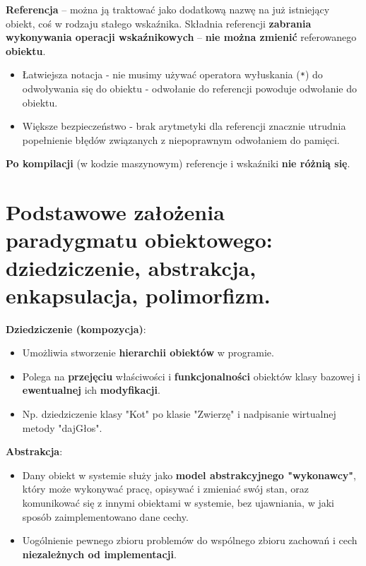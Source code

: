 \documentclass[main.tex]{subfiles}
\begin{document}
    \noindent \textbf{Referencja} -- można ją traktować jako dodatkową nazwę na już istniejący obiekt, coś w rodzaju
    stałego wskaźnika. Składnia referencji \textbf{zabrania wykonywania operacji wskaźnikowych} -- \textbf{nie można
    zmienić} referowanego \textbf{obiektu}.
    \begin{itemize}
        \item Łatwiejsza notacja - nie musimy używać operatora wyłuskania (\texttt{*}) do odwoływania się do obiektu -
        odwołanie do referencji powoduje odwołanie do obiektu.
        \item Większe bezpieczeństwo - brak arytmetyki dla referencji znacznie utrudnia popełnienie błędów związanych
        z niepoprawnym odwołaniem do pamięci.
    \end{itemize}

    \noindent \textbf{Po kompilacji} (w kodzie maszynowym) referencje i wskaźniki \textbf{nie różnią się}.


    \section{Podstawowe założenia paradygmatu obiektowego: dziedziczenie, abstrakcja, enkapsulacja, polimorfizm.}

    \textbf{Dziedziczenie (kompozycja)}:
    \begin{itemize}[noitemsep]
        \item Umożliwia stworzenie \textbf{hierarchii obiektów} w programie.
        \item Polega na \textbf{przejęciu} właściwości i \textbf{funkcjonalności} obiektów klasy bazowej
        i \textbf{ewentualnej} ich \textbf{modyfikacji}.
        \item Np. dziedziczenie klasy "Kot" po klasie "Zwierzę" i nadpisanie wirtualnej metody "dajGłos".
    \end{itemize}


    \noindent \textbf{Abstrakcja}:
    \begin{itemize}[noitemsep]
        \item Dany obiekt w systemie służy jako \textbf{model abstrakcyjnego "wykonawcy"}, który może wykonywać pracę, opisywać i zmieniać swój stan, oraz komunikować się
        z innymi obiektami w systemie, bez ujawniania, w jaki sposób zaimplementowano dane cechy.
        \item Uogólnienie pewnego zbioru problemów do wspólnego zbioru zachowań i cech \textbf{niezależnych od implementacji}.
    \end{itemize}
\end{document}
